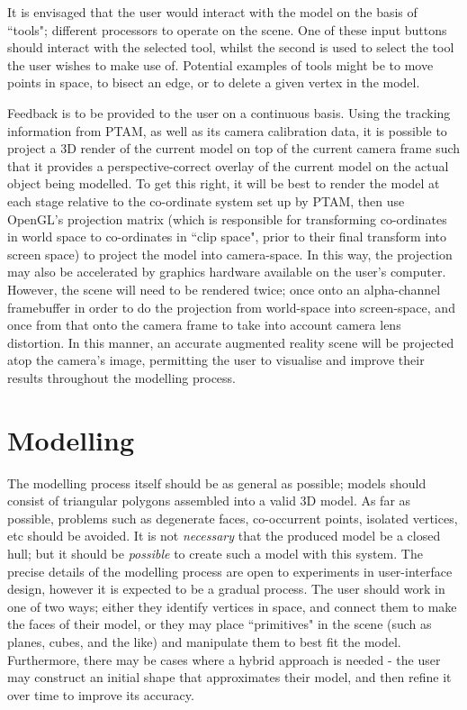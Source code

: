 \documentclass[a4paper,10pt]{report}
\begin{document}
It is envisaged that the user would interact with the model on the basis of ``tools"; different processors to operate on the scene. One of these input buttons should interact with the selected tool, whilst the second is used to select the tool the user wishes to make use of. Potential examples of tools might be to move points in space, to bisect an edge, or to delete a given vertex in the model.

Feedback is to be provided to the user on a continuous basis. Using the tracking information from PTAM, as well as its camera calibration data, it is possible to project a 3D render of the current model on top of the current camera frame such that it provides a perspective-correct overlay of the current model on the actual object being modelled. To get this right, it will be best to render the model at each stage relative to the co-ordinate system set up by PTAM, then use OpenGL's projection matrix (which is responsible for transforming  co-ordinates in world space to co-ordinates in ``clip space", prior to their final transform into screen space) to project the model into camera-space. In this way, the projection may also be accelerated by graphics hardware available on the user's computer. However, the scene will need to be rendered twice; once onto an alpha-channel framebuffer in order to do the projection from world-space into screen-space, and once from that onto the camera frame to take into account camera lens distortion. In this manner, an accurate augmented reality scene will be projected atop the camera's image, permitting the user to visualise and improve their results throughout the modelling process.

\section{Modelling}
\label{approachmodel}
The modelling process itself should be as general as possible; models should consist of triangular polygons assembled into a valid 3D model. As far as possible, problems such as degenerate faces, co-occurrent points, isolated vertices, etc should be avoided. It is not \textit{necessary} that the produced model be a closed hull; but it should be \textit{possible} to create such a model with this system. The precise details of the modelling process are open to experiments in user-interface design, however it is expected to be a gradual process. The user should work in one of two ways; either they identify vertices in space, and connect them to make the faces of their model, or they may place ``primitives" in the scene (such as planes, cubes, and the like) and manipulate them to best fit the model. Furthermore, there may be cases where a hybrid approach is needed - the user may construct an initial shape that approximates their model, and then refine it over time to improve its accuracy.
\end{document}
